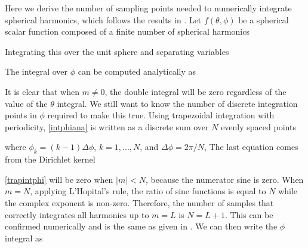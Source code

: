Here we derive the number of sampling points needed to numerically integrate spherical harmonics, which follows the results in \cite{darve2000fast}.  Let $f(\theta,\phi)$ be a spherical scalar function composed of a finite number of spherical harmonics

Integrating this over the unit sphere and separating variables

The integral over $\phi$ can be computed analytically as

It is clear that when $m\ne0$, the double integral will be zero regardless of the value of the $\theta$ integral. We still want to know the number of discrete integration points in $\phi$ required to make this true.  Using trapezoidal integration with periodicity, \eqref{intphiana} is written as a discrete sum over $N$ evenly spaced points

\noindent where $\phi_k = (k-1) \Delta\phi$, $k = 1,...,N$, and $\Delta \phi = 2\pi/N$, The last equation comes from the Dirichlet kernel

\eqref{trapintphi} will be zero when $\vert m \vert < N$, because the numerator sine is zero. When $m = N$, applying L'Hopital's rule, the ratio of sine functions is equal to $N$ while the complex exponent is non-zero. Therefore, the number of samples that correctly integrates all harmonics up to $m = L$ is $N = L + 1$. This can be confirmed numerically and is the same as given in \cite{darve2000fast, beentjes2015quadrature}. We can then write the $\phi$ integral as 

